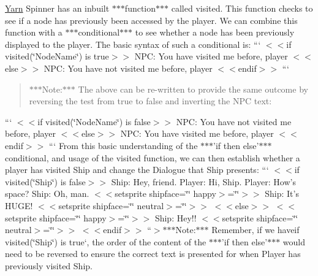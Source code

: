 \hyperlink{a00053}{Yarn} Spinner has an inbuilt $\ast$$\ast$$\ast$function$\ast$$\ast$$\ast$ called {\ttfamily visited}. This function checks to see if a node has previously been accessed by the player. We can combine this function with a $\ast$$\ast$$\ast$conditional$\ast$$\ast$$\ast$ to see whether a node has been previously displayed to the player. The basic syntax of such a conditional is\-: ``` $<$$<$if visited(\char`\"{}\-Node\-Name\char`\"{}) is true$>$$>$ N\-P\-C\-: You have visited me before, player $<$$<$else$>$$>$ N\-P\-C\-: You have not visited me before, player $<$$<$endif$>$$>$ ``` \begin{quotation}
$\ast$$\ast$$\ast$\-Note\-:$\ast$$\ast$$\ast$ The above can be re-\/written to provide the same outcome by reversing the test from true to false and inverting the N\-P\-C text\-:

\end{quotation}
``` $<$$<$if visited(\char`\"{}\-Node\-Name\char`\"{}) is false$>$$>$ N\-P\-C\-: You have not visited me before, player $<$$<$else$>$$>$ N\-P\-C\-: You have visited me before, player $<$$<$endif$>$$>$ ``` From this basic understanding of the $\ast$$\ast$$\ast$'if then else'$\ast$$\ast$$\ast$ conditional, and usage of the {\ttfamily visited} function, we can then establish whether a player has visited Ship and change the Dialogue that Ship presents\-: ``` $<$$<$if visited(\char`\"{}\-Ship\char`\"{}) is false$>$$>$ Ship\-: Hey, friend. Player\-: Hi, Ship. Player\-: How's space? Ship\-: Oh, man. $<$$<$setsprite shipface=\char`\"{}\char`\"{} happy$>$=\char`\"{}\char`\"{}$>$$>$ Ship\-: It's H\-U\-G\-E! $<$$<$setsprite shipface=\char`\"{}\char`\"{} neutral$>$=\char`\"{}\char`\"{}$>$$>$ $<$$<$else$>$$>$ $<$$<$setsprite shipface=\char`\"{}\char`\"{} happy$>$=\char`\"{}\char`\"{}$>$$>$ Ship\-: Hey!! $<$$<$setsprite shipface=\char`\"{}\char`\"{} neutral$>$=\char`\"{}\char`\"{}$>$$>$ $<$$<$endif$>$$>$ ``{\ttfamily  $>$$\ast$$\ast$$\ast$\-Note\-:$\ast$$\ast$$\ast$ Remember, if we have}if visited(\char`\"{}\-Ship\char`\"{}) is true`, the order of the content of the $\ast$$\ast$$\ast$'if then else'$\ast$$\ast$$\ast$ would need to be reversed to ensure the correct text is presented for when Player has previously visited Ship.

